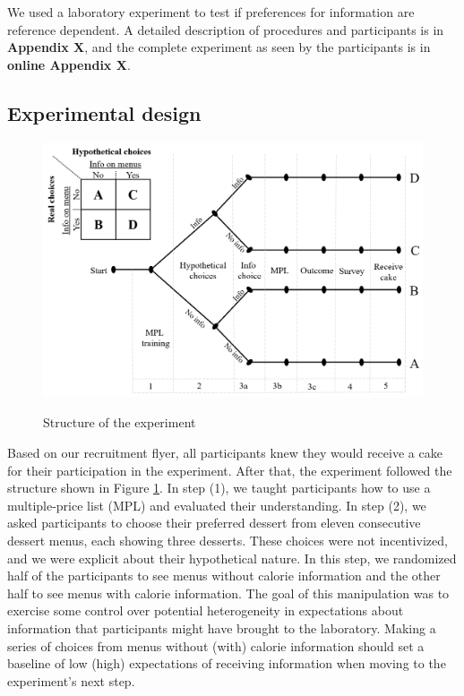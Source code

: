 \documentclass[12pt]{article}
\begin{document}
We used a laboratory experiment to test if preferences for information are reference dependent. A detailed description of procedures and participants is in \textbf{ Appendix X}, and the complete experiment as seen by the participants is in \textbf{online Appendix X}.

\subsection{Experimental design}

\begin{figure}[ht]
  \caption{Structure of the experiment}\label{fig:expDesign}
  \begin{center}
  {\includegraphics[width=1\textwidth]{./figures/experimentalDesign.png}}
  \end{center}
\end{figure}

Based on our recruitment flyer, all participants knew they would receive a cake for their participation in the experiment. After that, the experiment followed the structure shown in Figure \ref{fig:expDesign}. In step (1), we taught participants how to use a multiple-price list (MPL) and evaluated their understanding. In step (2), we asked participants to choose their preferred dessert from eleven consecutive dessert menus, each showing three desserts. These choices were not incentivized, and we were explicit about their hypothetical nature. In this step, we randomized half of the participants to see menus without calorie information and the other half to see menus with calorie information. The goal of this manipulation was to exercise some control over potential heterogeneity in expectations about information that participants might have brought to the laboratory. Making a series of choices from menus without (with) calorie information should set a baseline of low (high) expectations of receiving information when moving to the experiment’s next step.
\end{document}
